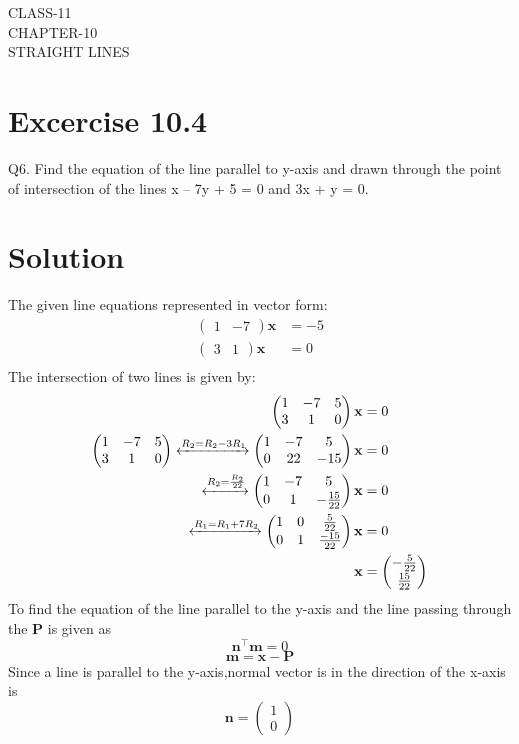 \documentclass[12pt]{article}
\newcommand{\myvec}[1]{\ensuremath{\begin{pmatrix}#1\end{pmatrix}}}
\let\vec\mathbf
\begin{document}
\begin{center}
\textbf\large{CLASS-11 \\ CHAPTER-10 \\ STRAIGHT LINES}
\end{center}
\section*{Excercise 10.4}
Q6. Find the equation of the line parallel to y-axis and drawn through the point of
intersection of the lines x – 7y + 5 = 0 and 3x + y = 0.
\section*{Solution}
The given line equations represented in vector form:
\begin{align}
\myvec{1&-7}\vec{x}&=-5\\
\myvec{3&1}\vec{x}&=0\\
\end{align}
The intersection of two lines is given by:
\begin{align}
\myvec{
1&-7&5\\
3&1&0
} \vec{x}&=0\\
\myvec{
1&-7&5\\
3&1&0
}
\xleftrightarrow[]{R_2=R_2-3R_1}
\myvec{
1&-7&5\\
0&22&-15
}\vec{x}&=0\\\xleftrightarrow[]{R_2=\frac{R_2}{22}}
\myvec{
	1&-7&5\\[1pt]
0&1&-\frac{15}{22}
}\vec{x}&=0\\
\xleftrightarrow[]{R_1={R_1}+7{R_2}}
\myvec{
1&0&\frac{5}{22}\\[1pt]
0&1&\frac{-15}{22}
}\vec{x}&=0 \label{eq:7}\\
	\vec{x}&=\myvec{-\frac{5}{22}\\[1pt] \frac{15}{22}}\\
\end{align}
To find the equation of the line parallel to the y-axis and the line passing through the $\vec{P}$ is given as
\begin{equation}
    \vec{n}^{\top}\vec{m}=0
    \label{eq:line}
\end{equation}
\begin{equation}
    \vec{m}=\vec{x}-\vec{P}
    \label{eq:direction}
\end{equation}
Since a line is parallel to the y-axis,normal vector is in the direction of the x-axis is
\begin{equation}
    \vec{n}=\myvec{1\\0}
    \label{eq:normal}
\end{equation}
\end{document}
